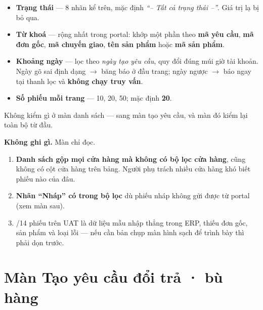 \mloc

\begin{itemize}[leftmargin=*]
  \item \textbf{Trạng thái} --- 8 nhãn kể trên, mặc định \emph{``-- Tất cả trạng thái --''}.
        Giá trị lạ bị bỏ qua.
  \item \textbf{Từ khoá} --- rộng nhất trong portal: khớp một phần theo \textbf{mã yêu cầu},
        \textbf{mã đơn gốc}, \textbf{mã chuyến giao}, \textbf{tên sản phẩm} hoặc \textbf{mã
        sản phẩm}.
  \item \textbf{Khoảng ngày} --- lọc theo \emph{ngày tạo yêu cầu}, quy đổi đúng múi giờ tài
        khoản. Ngày gõ sai định dạng $\rightarrow$ băng báo ở đầu trang; ngày ngược
        $\rightarrow$ báo ngay tại thanh lọc và \textbf{không chạy truy vấn}.
  \item \textbf{Số phiếu mỗi trang} --- 10, 20, 50; mặc định \textbf{20}.
\end{itemize}


Không kiểm gì ở màn danh sách --- sang màn tạo yêu cầu, và màn đó kiểm lại toàn bộ từ đầu.

\mghi

\textbf{Không ghi gì.} Màn chỉ đọc.

\mhoi

\begin{ask}
\begin{enumerate}[leftmargin=*]
  \item \textbf{Danh sách gộp mọi cửa hàng mà không có bộ lọc cửa hàng}, cũng không có cột cửa
        hàng trên bảng. Người phụ trách nhiều cửa hàng khó biết phiếu nào của đâu.
  \item \textbf{Nhãn ``Nháp'' có trong bộ lọc} dù phiếu nháp không gửi được từ portal (xem màn
        sau).
  \item {}/14 phiếu trên UAT là dữ liệu mẫu nhập thẳng trong ERP, thiếu đơn gốc, sản phẩm
        và loại lỗi --- nếu cần bản chụp màn hình sạch để trình bày thì phải dọn trước.
\end{enumerate}
\end{ask}

\section{Màn Tạo yêu cầu đổi trả · bù hàng}
\medskip


